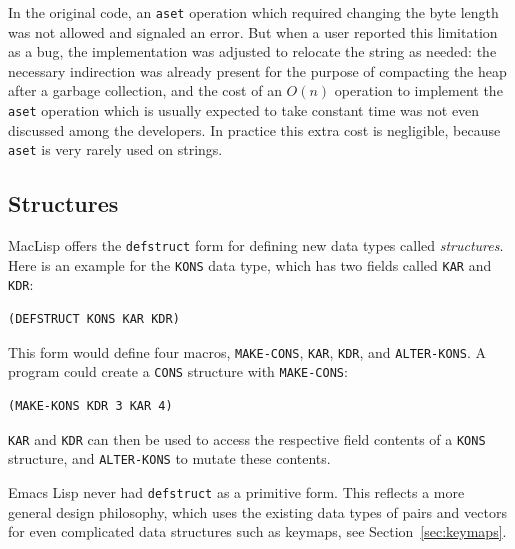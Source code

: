 \documentclass[format=acmsmall, review]{acmart}
\newcommand \Elisp {Emacs Lisp}
\begin{document}
In the original code, an \texttt{aset} operation which required changing the
byte length was not allowed and signaled an error.  But when a user reported
this limitation as a bug, the implementation was adjusted to relocate the
string as needed: the necessary indirection was already present for the
purpose of compacting the heap after a garbage collection, and the cost of
an $O(n)$ operation to implement the \texttt{aset} operation which is
usually expected to take constant time was not even discussed among the
developers. In practice this extra cost is negligible, because
\texttt{aset} is very rarely used on strings.


\subsection{Structures}
\label{sec:structures}

MacLisp offers the \texttt{defstruct} form for defining new data
types called \textit{structures}.  Here is an example for the
\texttt{KONS} data type, which has two fields called \texttt{KAR} and \texttt{KDR}:
%
\begin{verbatim}
(DEFSTRUCT KONS KAR KDR)
\end{verbatim}
%
This form would define four macros, \texttt{MAKE-CONS}, \texttt{KAR},
\texttt{KDR}, and \texttt{ALTER-KONS}.  A program could create a
\texttt{CONS} structure with \texttt{MAKE-CONS}:
%
\begin{verbatim}
(MAKE-KONS KDR 3 KAR 4)
\end{verbatim}
%
\texttt{KAR} and \texttt{KDR} can then be used to access the
respective field contents of a \texttt{KONS} structure, and
\texttt{ALTER-KONS} to mutate these contents.

\Elisp{} never had \texttt{defstruct} as a primitive form.  This
reflects a more general design philosophy, which uses the existing
data types of pairs and vectors for even complicated data structures
such as keymaps, see Section~\ref{sec:keymaps}.
\end{document}
